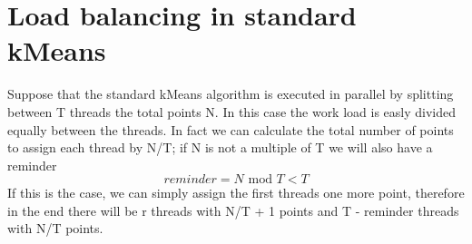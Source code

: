 \documentclass{report}
\begin{document}
\begin{minipage}[b]{0.48\textwidth}
    \section*{Load balancing in standard kMeans}
    Suppose that the standard kMeans algorithm is executed in parallel by splitting between T threads the total points N. In this case the work load is easly divided equally between the threads. In fact we can calculate the total number of points to assign each thread by N/T; if N is not a multiple of T we will also have a reminder
    \begin{equation}
      reminder = N \text{ mod } T < T
    \end{equation}
    If this is the case, we can simply assign the first threads one more point, therefore in the end there will be r threads with N/T + 1 points and T - reminder threads with N/T points.
\end{minipage}
\hspace{0.1in}
\end{document}
